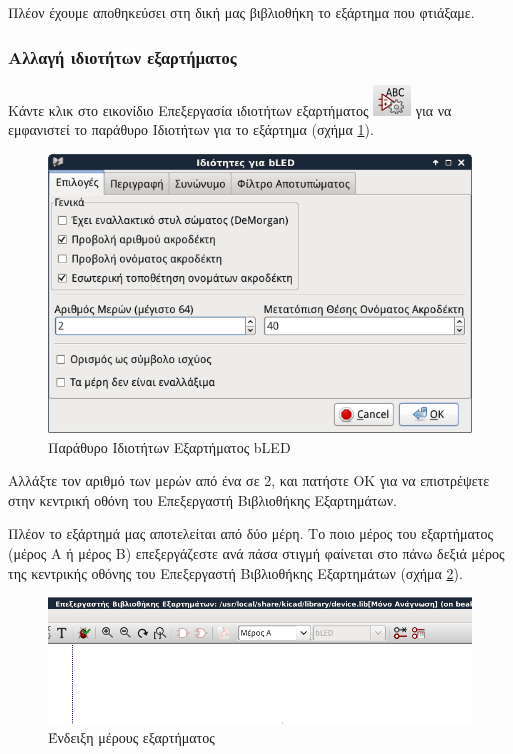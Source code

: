 \documentclass[a4paper]{article}
\begin{document}
Πλέον έχουμε αποθηκεύσει στη δική μας βιβλιοθήκη το εξάρτημα που φτιάξαμε.

\subsubsection{Αλλαγή ιδιοτήτων εξαρτήματος}
Κάντε κλικ στο εικονίδιο Επεξεργασία ιδιοτήτων εξαρτήματος \includegraphics[scale=.5]{img/libed-ico-compprop.png} 
για να εμφανιστεί το παράθυρο Ιδιοτήτων για το εξάρτημα (σχήμα \ref{fig:libed-dial-bledprop}). 

\begin{figure}
  \begin{center}
    \includegraphics[width=.5\textwidth]{img/libed-dial-bledprop.png}
    \caption{Παράθυρο Ιδιοτήτων Εξαρτήματος bLED}
    \label{fig:libed-dial-bledprop}
  \end{center}
\end{figure}

Αλλάξτε τον αριθμό των μερών από ένα σε 2, και πατήστε ΟΚ για να επιστρέψετε στην κεντρική οθόνη του Επεξεργαστή Βιβλιοθήκης Εξαρτημάτων.

Πλέον το εξάρτημά μας αποτελείται από δύο μέρη. Το ποιο μέρος του εξαρτήματος (μέρος Α ή μέρος Β) επεξεργάζεστε ανά πάσα στιγμή φαίνεται στο πάνω δεξιά μέρος της κεντρικής οθόνης του Επεξεργαστή Βιβλιοθήκης Εξαρτημάτων (σχήμα \ref{fig:libed-ui-unit}).

\begin{figure}
  \begin{center}
    \includegraphics[width=.5\textwidth]{img/libed-ui-unit.png}
    \caption{Ένδειξη μέρους εξαρτήματος}
    \label{fig:libed-ui-unit}
  \end{center}
\end{figure}
\end{document}
